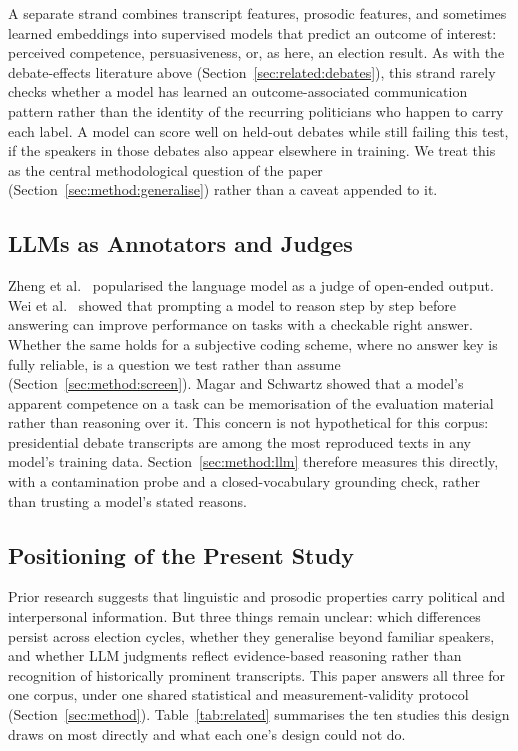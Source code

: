 \documentclass[pdflatex,sn-mathphys-num]{sn-jnl}%
\begin{document}
A separate strand combines transcript features, prosodic features, and
sometimes learned embeddings into supervised models that predict an outcome
of interest: perceived competence, persuasiveness, or, as here, an election
result. As with the debate-effects literature above
(Section~\ref{sec:related:debates}), this strand rarely checks whether a
model has learned an outcome-associated communication pattern rather than
the identity of the recurring politicians who happen to carry each label. A
model can score well on held-out debates while still failing this test, if
the speakers in those debates also appear elsewhere in training. We treat
this as the central methodological question of the paper
(Section~\ref{sec:method:generalise}) rather than a caveat appended to it.

\subsection{LLMs as Annotators and Judges}
\label{sec:related:llm}

Zheng et al.\ \cite{zheng2023judging} popularised the language model as a
judge of open-ended output. Wei et al.\ \cite{wei2022chain} showed that
prompting a model to reason step by step before answering can improve
performance on tasks with a checkable right answer. Whether the same holds
for a subjective coding scheme, where no answer key is fully reliable, is a
question we test rather than assume (Section~\ref{sec:method:screen}).
Magar and Schwartz \cite{magar2022data} showed that a model's apparent
competence on a task can be memorisation of the evaluation material rather
than reasoning over it. This concern is not hypothetical for this corpus:
presidential debate transcripts are among the most reproduced texts in any
model's training data. Section~\ref{sec:method:llm} therefore measures this
directly, with a contamination probe and a closed-vocabulary grounding
check, rather than trusting a model's stated reasons.

\subsection{Positioning of the Present Study}
\label{sec:related:position}

Prior research suggests that linguistic and prosodic properties carry
political and interpersonal information. But three things remain unclear:
which differences persist across election cycles, whether they generalise beyond
familiar speakers, and whether LLM judgments reflect evidence-based
reasoning rather than recognition of historically prominent transcripts.
This paper answers all three for one corpus, under one shared statistical
and measurement-validity protocol (Section~\ref{sec:method}). Table~\ref{tab:related}
summarises the ten studies this design draws on most directly and what each
one's design could not do.
\end{document}
